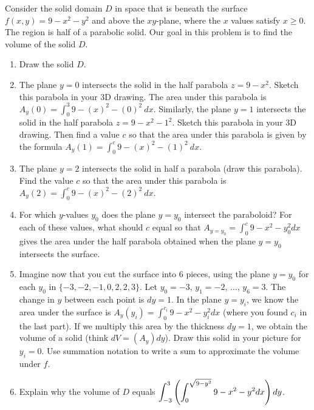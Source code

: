 \begin{problem}
Consider the solid domain $D$ in space that is beneath the surface $f(x,y)=9-x^2-y^2$ and above the $xy$-plane, where the $x$ values satisfy $x\geq 0$.  The region is half of a parabolic solid.  Our goal in this problem is to find the volume of the solid $D$.
\begin{enumerate}
 \item Draw the solid $D$. 
 \item The plane $y=0$ intersects the solid in the half parabola $z=9-x^2$. Sketch this parabola in your 3D drawing. The area under this parabola is $A_y(0)= \int_0^3 9-(x)^2-(0)^2 \ dx$. 
 Similarly, the plane $y=1$ intersects the solid in the half parabola $z=9-x^2-1^2$. Sketch this parabola in your 3D drawing. Then find a value $c$ so that the area under this parabola is given by the formula $A_y(1)=\int_0^{c} 9-(x)^2-(1)^2 \ dx$.
 \item The plane $y=2$ intersects the solid in half a parabola (draw this parabola). Find the value $c$ so that the area under this parabola is $A_y(2)=\int_0^c 9-(x)^2-(2)^2 \ dx$.
 \item {}
For which $y$-values $y_0$ does the plane $y=y_0$ intersect the paraboloid? For each of these values, what should $c$ equal so that $A_{y=y_0} = \int_0^c 9-x^2-y_0^2 dx$ gives the area under the half parabola obtained when the plane $y=y_0$ intersects the surface. 
 \item Imagine now that you cut the surface into 6 pieces, using the plane $y=y_0$ for each $y_0$ in $\{-3,-2,-1,0, 2, 2,3\}$. Let $y_0=-3$, $y_1=-2$, $\ldots$, $y_{6}=3$. The change in $y$ between each point is $dy=1$. 
 In the plane $y=y_i$, we know the area under the surface is $A_y(y_i) = \int_0^{c_i} 9-x^2-y_i^2 dx$ (where you found $c_i$ in the last part).  If we multiply this area by the thickness $dy=1$, we obtain the volume of a solid (think $dV = (A_y)dy$).  Draw this solid in your picture for $y_i = 0$. Use summation notation to write a sum to approximate the volume under $f$.
\item Explain why the volume of $D$ equals $\displaystyle\int_{-3}^{3} \left(\int_0^{\sqrt{9-y^2}}9-x^2-y^2 dx\right) dy$.
\end{enumerate}
\end{problem}
